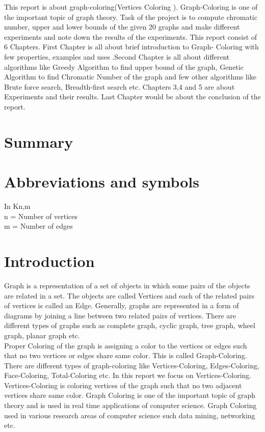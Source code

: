 \documentclass[a4paper]{report}
\begin{document}
	
	This report is about graph-coloring(Vertices Coloring ). Graph-Coloring is one of the important topic of graph theory. Task of the project is to compute chromatic number, upper and lower bounds of the given 20 graphs and make different experiments and note down the results of the experiments. This report consist of 6 Chapters. First Chapter is all about brief introduction to Graph- Coloring with few properties, examples and uses .Second Chapter is all about different algorithms like Greedy Algorithm to find upper bound of the graph, Genetic Algorithm to find Chromatic Number of the graph and few other algorithms like Brute force search, Breadth-first search etc. Chapters 3,4 and 5 are about Experiments and their results. Last Chapter would be about the conclusion of the report. 
	

	\chapter*{Summary}
	
	\tableofcontents
	
	\chapter*{Abbreviations and symbols}
	In Kn,m
\\
	n = Number of vertices
\\
	m = Number of edges
\\
	
	
	\chapter{Introduction}
	
	Graph is a representation of a set of objects in which some pairs of the objects are related in a set. The objects are called Vertices and each of the related pairs of vertices is called an Edge. Generally, graphs are represented in a form of diagrams by joining a line between two related pairs of vertices. There are different types of graphs such as complete graph, cyclic graph, tree graph, wheel graph, planar graph etc. 
\\
	Proper Coloring of the graph is assigning a color to the vertices or edges such that no two vertices or edges share same color. This is called Graph-Coloring. There are different types of graph-coloring like Vertices-Coloring, Edges-Coloring, Face-Coloring, Total-Coloring etc. In this report we focus on Vertices-Coloring. Vertices-Coloring is coloring vertices of the graph such that no two adjacent vertices share same color. Graph Coloring is one of the important topic of graph theory and is used in real time applications of computer science. Graph Coloring used in various research areas of computer science such data mining, networking etc.
\\
	
\end{document}
